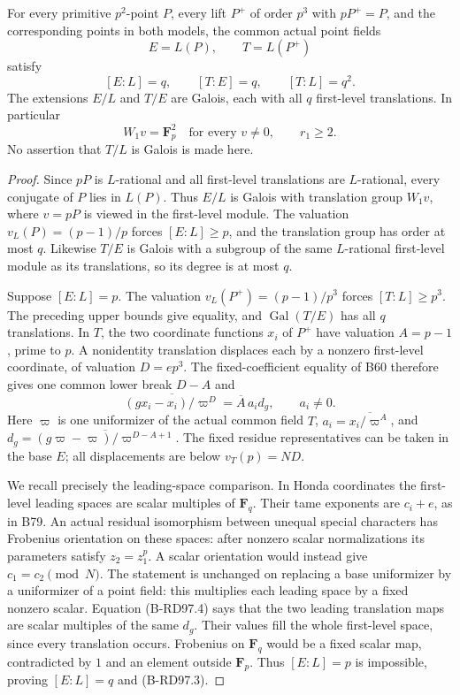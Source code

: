 \begin{lemma}
\label{lem:B-RD97-degrees}
For every primitive $p^2$-point $P$, every lift $P^+$ of order
$p^3$ with $pP^+=P$, and the corresponding points in both models,
the common actual point fields
\[
 E=L(P),\qquad T=L(P^+)
\]
satisfy
\[
 [E:L]=q,\qquad[T:E]=q,\qquad[T:L]=q^2.              \tag{B-RD97.2}
\]
The extensions $E/L$ and $T/E$ are Galois, each with all $q$
first-level translations. In particular
\[
       W_1v=\mathbf F_p^2\quad\text{for every }v\ne0,
       \qquad r_1\ge2.                              \tag{B-RD97.3}
\]
No assertion that $T/L$ is Galois is made here.
\end{lemma}
\begin{proof}
Since $pP$ is $L$-rational and all first-level translations are
$L$-rational, every conjugate of $P$ lies in $L(P)$. Thus $E/L$
is Galois with translation group $W_1v$, where $v=pP$ is viewed
in the first-level module. The valuation $v_L(P)=(p-1)/p$
forces $[E:L]\ge p$, and the translation group has order at most
$q$. Likewise $T/E$ is Galois with a subgroup of the same
$L$-rational first-level module as its translations, so its degree
is at most $q$.

Suppose $[E:L]=p$. The valuation
$v_L(P^+)=(p-1)/p^3$ forces $[T:L]\ge p^3$. The preceding
upper bounds give equality, and $\operatorname{Gal}(T/E)$ has
all $q$ translations. In $T$, the two coordinate functions $x_i$
of $P^+$ have valuation $A=p-1$, prime to $p$. A nonidentity
translation displaces each by a nonzero first-level coordinate,
of valuation $D=ep^3$. The fixed-coefficient equality of B60
therefore gives one common lower break $D-A$ and
\[
       \overline{(gx_i-x_i)/\varpi^D}
                     =\overline A\,a_i d_g,
       \qquad a_i\ne0.                              \tag{B-RD97.4}
\]
Here $\varpi$ is one uniformizer of the actual common field $T$,
$a_i=\overline{x_i/\varpi^A}$, and
$d_g=\overline{(g\varpi-\varpi)/\varpi^{D-A+1}}$.
The fixed residue representatives can be taken in the base $E$;
all displacements are below $v_T(p)=ND$.

We recall precisely the leading-space comparison. In Honda
coordinates the first-level leading spaces are scalar multiples
of $\mathbf F_q$. Their tame exponents are $c_i+e$, as in B79.
An actual residual isomorphism between unequal special characters
has Frobenius orientation on these spaces: after nonzero scalar
normalizations its parameters satisfy $z_2=z_1^p$. A scalar
orientation would instead give $c_1=c_2\pmod N$. The statement
is unchanged on replacing a base uniformizer by a uniformizer of
a point field: this multiplies each leading space by a fixed
nonzero scalar. Equation (B-RD97.4) says that the two leading
translation maps are scalar multiples of the same $d_g$.
Their values fill the whole first-level space, since every
translation occurs. Frobenius on $\mathbf F_q$ would be a fixed
scalar map, contradicted by $1$ and an element outside $\mathbf F_p$.
Thus $[E:L]=p$ is impossible, proving $[E:L]=q$ and (B-RD97.3).


\end{proof}

